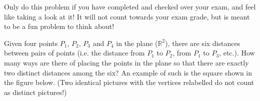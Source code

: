 \documentclass[10pt]{amsart}
\newcommand{\R}{\mathbb R}
\begin{document}
\vfill\pagebreak

 Only do this
problem if you have completed and checked over your exam, and feel like
taking a look at it! It will not count
towards your exam grade, but is meant to be a fun problem to think
about!

Given four points $P_1$, $P_2$, $P_3$ and $P_4$ in the plane ($\R^2$), 
there are six distances between pairs of points (i.e. the distance
from $P_1$ to $P_2$, from $P_1$ to $P_3$, etc.).  How many ways are
there of placing the points in the plane so that there are exactly two 
distinct distances among the six?  An example of such is the square
shown in the figure below.  (Two identical pictures with the vertices
relabelled do not count as distinct pictures!)


\begin{figure}[h]
\end{figure}
\end{document}

